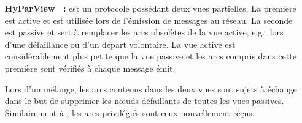 \begin{itemize}
\item [\textbf{HyParView~\cite{leitao2007dependable} :}] est un protocole
  possédant deux vues partielles. La première est active et est utilisée lors de
  l'émission de messages au réseau. La seconde est passive et sert à remplacer
  les arcs obsolètes de la vue active, e.g., lors d'une défaillance ou d'un
  départ volontaire.  La vue active est considérablement plus petite que la vue
  passive et les arcs compris dans cette première sont vérifiés à chaque message
  émit.

  Lors d'un mélange, les arcs contenus dans les deux vues sont sujets à échange
  dans le but de supprimer les nœuds défaillants de toutes les vues
  passives. Similairement à \CYCLON, les arcs privilégiés sont ceux nouvellement
  réçus. 
\end{itemize}

